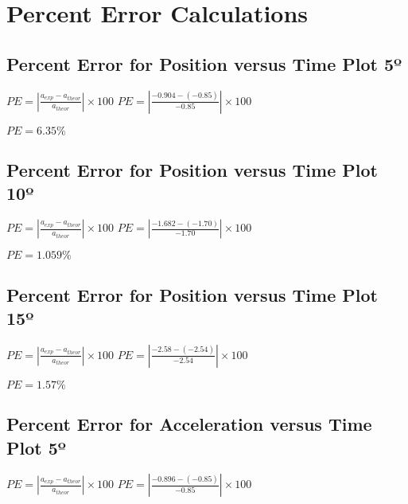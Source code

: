 \documentclass{article}
\begin{document}
\section{Percent Error Calculations}
\subsection{Percent Error for Position versus Time Plot 5º}
$PE = \left |\frac{a_{exp}-a_{theor}}{a_{theor}} \right | \times 100 $
\newline
\newline
$PE = \left |\frac{-0.904-(-0.85)}{-0.85} \right | \times 100 $
\newline
\newline



$PE = 6.35 \%$
\subsection{Percent Error for Position versus Time Plot 10º}
$PE = \left |\frac{a_{exp}-a_{theor}}{a_{theor}} \right | \times 100 $
\newline
\newline
$PE = \left |\frac{-1.682-(-1.70)}{-1.70} \right | \times 100 $
\newline
\newline



$PE = 1.059 \%$
\subsection{Percent Error for Position versus Time Plot 15º}
$PE = \left |\frac{a_{exp}-a_{theor}}{a_{theor}} \right | \times 100 $
\newline
\newline
$PE = \left |\frac{-2.58-(-2.54)}{-2.54} \right | \times 100 $
\newline
\newline



$PE = 1.57 \%$

\subsection{Percent Error for Acceleration versus Time Plot 5º}
$PE = \left |\frac{a_{exp}-a_{theor}}{a_{theor}} \right | \times 100 $
\newline
\newline
$PE = \left |\frac{-0.896-(-0.85)}{-0.85} \right | \times 100 $
\newline
\newline
\end{document}
